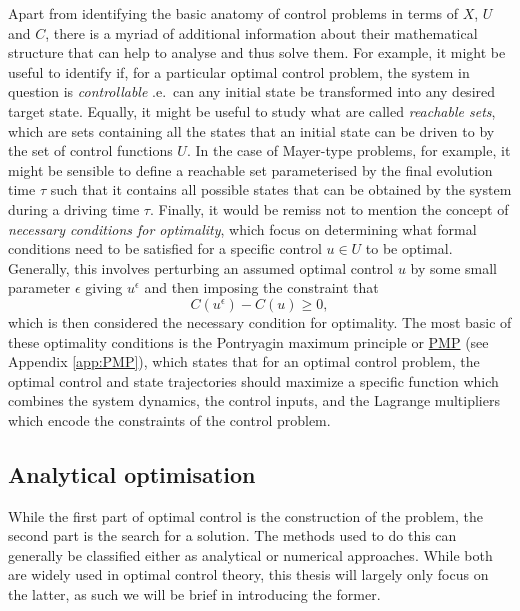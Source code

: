 \documentclass[a4paper,oneside,11pt]{book}
\newcommand{\acrref}[1]{\hyperref[acr:#1]{#1}}
\begin{document}
Apart from identifying the basic anatomy of control problems in terms of $X$, $U$ and $C$, there is a myriad of additional information about their mathematical structure that can help to analyse and thus solve them. For example, it might be useful to identify if, for a particular optimal control problem, the system in question is \emph{controllable}\cite{dirr_lie_2008, fleming_optimal_1975} \@i.e.~can any initial state be transformed into any desired target state. Equally, it might be useful to study what are called \emph{reachable sets}\cite{vom_ende_reachability_2020, fleming_optimal_1975}, which are sets containing all the states that an initial state can be driven to by the set of control functions $U$. In the case of Mayer-type problems, for example, it might be sensible to define a reachable set parameterised by the final evolution time $\tau$ such that it contains all possible states that can be obtained by the system during a driving time $\tau$. Finally, it would be remiss not to mention the concept of \emph{necessary conditions for optimality}\cite{mangasarian_sufficient_1966}, which focus on determining what formal conditions need to be satisfied for a specific control $u \in U$ to be optimal. Generally, this involves perturbing an assumed optimal control $u$ by some small parameter $\epsilon$ giving $u^{\epsilon}$ and then imposing the constraint that
\begin{equation}\label{eq:optimality_condition}
    C(u^{\epsilon}) - C(u) \geq 0,
\end{equation}
which is then considered the necessary condition for optimality. The most basic of these optimality conditions is the Pontryagin maximum principle or \acrref{PMP} \cite{boltyanski_nonclassical_1999} (see Appendix \ref{app:PMP}), which states that for an optimal control problem, the optimal control and state trajectories should maximize a specific function which combines the system dynamics, the control inputs, and the Lagrange multipliers which encode the constraints of the control problem.

\subsection{Analytical optimisation}\label{sec:3.1.2_analytic_optimisation}

While the first part of optimal control is the construction of the problem, the second part is the search for a solution. The methods used to do this can generally be classified either as analytical or numerical approaches. While both are widely used in optimal control theory, this thesis will largely only focus on the latter, as such we will be brief in introducing the former. 
\end{document}
